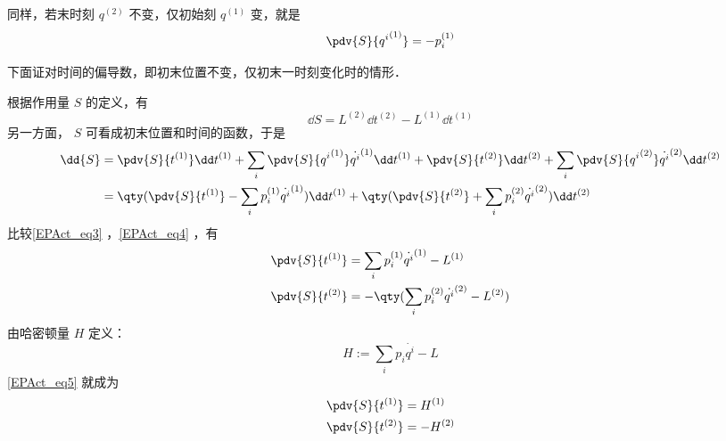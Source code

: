 同样，若末时刻 $q^{(2)}$ 不变，仅初始刻 $q^{(1)}$ 变，就是
\begin{equation}
\pdv{S}{{q^i}^{(1)}}=-p_i^{(1)}
\end{equation}

下面证对时间的偏导数，即初末位置不变，仅初末一时刻变化时的情形．

根据作用量 $S$ 的定义，有
\begin{equation}\label{EPAct_eq3}
\dd{S}=L^{(2)}\dd t^{(2)}-L^{(1)}\dd t^{(1)}
\end{equation}
另一方面， $S$ 可看成初末位置和时间的函数，于是
\begin{equation}\label{EPAct_eq4}
\begin{aligned}
\dd{S}&=\pdv{S}{t^{(1)}}\dd t^{(1)}+\sum_i\pdv{S}{{q^i}^{(1)}}\dot {q^i}^{(1)}\dd t^{(1)}+\pdv{S}{t^{(2)}}\dd t^{(2)}+\sum_i\pdv{S}{{q^i}^{(2)}}\dot {q^i}^{(2)}\dd t^{(2)}\\
&=\qty(\pdv{S}{t^{(1)}}-\sum_i p_i^{(1)}\dot {q^i}^{(1)})\dd t^{(1)}+\qty(\pdv{S}{t^{(2)}}+\sum_i p_i^{(2)}\dot {q^i}^{(2)})\dd t^{(2)}
\end{aligned}
\end{equation}
比较\autoref{EPAct_eq3} ，\autoref{EPAct_eq4} ，有
\begin{equation}\label{EPAct_eq5}
\begin{aligned}
\pdv{S}{t^{(1)}}&=\sum_i p_i^{(1)}\dot {q^i}^{(1)}-L^{(1)}\\
\pdv{S}{t^{(2)}}&=-\qty(\sum_i p_i^{(2)}\dot {q^i}^{(2)}-L^{(2)})
\end{aligned}
\end{equation}
由哈密顿量 $H$ 定义：
\begin{equation}
H:=\sum_i p_i\dot {q^i}-L
\end{equation}
\autoref{EPAct_eq5} 就成为
\begin{equation}
\begin{aligned}
\pdv{S}{t^{(1)}}&=H^{(1)}\\
\pdv{S}{t^{(2)}}&=-H^{(2)}
\end{aligned}
\end{equation}


